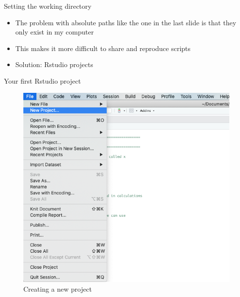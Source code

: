 \documentclass[ignorenonframetext,]{beamer}
\begin{document}
\begin{frame}{Setting the working directory}
\protect\hypertarget{setting-the-working-directory-3}{}

\begin{itemize}
\item
  The problem with absolute paths like the one in the last slide is that
  they only exist in my computer
\item
  This makes it more difficult to share and reproduce scripts
\item
  Solution: Rstudio projects
\end{itemize}

\end{frame}

\begin{frame}{Your first Rstudio project}
\protect\hypertarget{your-first-rstudio-project}{}

\begin{figure}
\includegraphics[scale=0.31]{figures/new-project-1}
\caption{Creating a new project}
\end{figure}

\end{frame}
\end{document}
